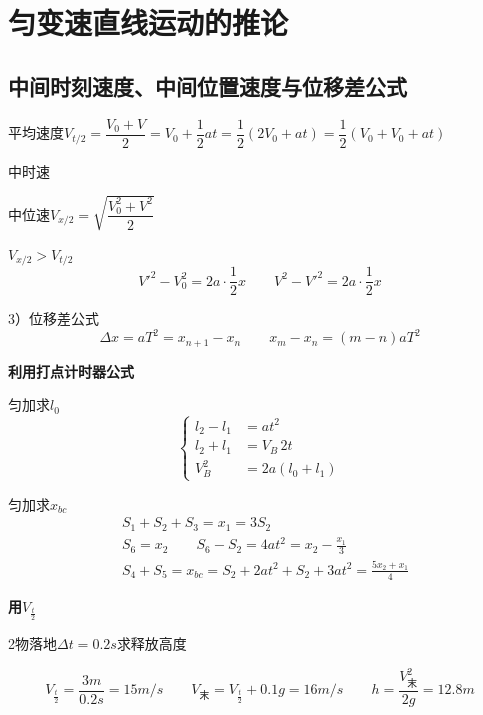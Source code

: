 \section{匀变速直线运动的推论}
\subsection{中间时刻速度、中间位置速度与位移差公式}
平均速度\quad $V_{t/2}=\dfrac{V_0+V}{2}=V_0+\dfrac12at=\dfrac12(2V_0+at)=\dfrac12(V_0+V_0+at)$

中时速

中位速\quad $V_{x/2}=\sqrt{\dfrac{V_0^2+V^2}{2}}$

$V_{x/2}>V_{t/2}$
\[
V'^2-V_0^2=2a\cdot\frac12x\qquad V^2-V'^2=2a\cdot\frac12x
\]

3）位移差公式
\[
\Delta x=aT^2=x_{n+1}-x_n\qquad x_m-x_n=(m-n)aT^2
\]

\textbf{利用打点计时器公式}

匀加\quad 求$l_0$
\[
\left\{\begin{aligned}
l_2-l_1&=at^2\\
l_2+l_1&=V_B\,2t\\
V_B^2&=2a(l_0+l_1)
\end{aligned}\right.
\]

匀加\quad 求$x_{bc}$
\begin{align*}
&S_1+S_2+S_3=x_1=3S_2\\
&S_6=x_2\qquad S_6-S_2=4at^2=x_2-\frac{x_1}{3}\\
&S_4+S_5=x_{bc}=S_2+2at^2+S_2+3at^2=\frac{5x_2+x_1}{4}
\end{align*}

\textbf{用$V_{\frac t2}$}

\begin{problem}[①]
2物落地\quad $\Delta t=0.2\unit{s}$\quad 求释放高度
\begin{solution}
\[
V_{\frac t2}=\frac{3\unit{m}}{0.2\unit{s}}=15\unit{m/s}\qquad
V_{\text{末}}=V_{\frac t2}+0.1g=16\unit{m/s}\qquad %
h=\frac{V_{\text{末}}^{2}}{2g}=12.8\unit{m}
\]
\end{solution}
\end{problem}

